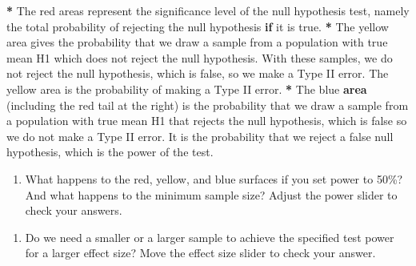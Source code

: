 \documentclass[a4paper]{book}
\newenvironment{Shaded}{\begin{snugshade}}{\end{snugshade}}
\newcommand{\KeywordTok}[1]{\textcolor[rgb]{0,0,0}{\textbf{#1}}}
\newcommand{\DecValTok}[1]{\textcolor[rgb]{0.00,0.00,0.00}{#1}}
\newcommand{\StringTok}[1]{\textcolor[rgb]{0.00,0.00,0.00}{#1}}
\newcommand{\ControlFlowTok}[1]{\textcolor[rgb]{0.00,0.00,0.00}{\textbf{#1}}}
\newcommand{\OperatorTok}[1]{\textcolor[rgb]{0.00,0.00,0.00}{\textbf{#1}}}
\newcommand{\NormalTok}[1]{#1}
\providecommand{\tightlist}{%
  \setlength{\itemsep}{0pt}\setlength{\parskip}{0pt}}
\theoremstyle{definition}
\theoremstyle{definition}
\theoremstyle{definition}
\theoremstyle{remark}
\begin{document}
\begin{Shaded}
\begin{Highlighting}[]
\OperatorTok{*}\StringTok{ }\NormalTok{The red areas represent the significance level of the null hypothesis test,}
\NormalTok{namely the total probability of rejecting the null hypothesis }\ControlFlowTok{if}\NormalTok{ it is true.}
\OperatorTok{*}\StringTok{ }\NormalTok{The yellow area gives the probability that we draw a sample from a population}
\NormalTok{with true mean H1 which does not reject the null hypothesis. With these}
\NormalTok{samples, we do not reject the null hypothesis, which is false, so we make a}
\NormalTok{Type II error. The yellow area is the probability of making a Type II error.}
\OperatorTok{*}\StringTok{ }\NormalTok{The blue }\KeywordTok{area}\NormalTok{ (including the red tail at the right) is the probability that}
\NormalTok{we draw a sample from a population with true mean H1 that rejects the null}
\NormalTok{hypothesis, which is false so we do not make a Type II error. It is the}
\NormalTok{probability that we reject a false null hypothesis, which is the power of the}
\NormalTok{test.}
\end{Highlighting}
\end{Shaded}

\begin{enumerate}
\def\labelenumi{\arabic{enumi}.}
\setcounter{enumi}{1}
\tightlist
\item
  What happens to the red, yellow, and blue surfaces if you set power to
  50\%? And what happens to the minimum sample size? Adjust the power
  slider to check your answers.
\end{enumerate}

\begin{Shaded}
\end{Shaded}

\begin{enumerate}
\def\labelenumi{\arabic{enumi}.}
\setcounter{enumi}{2}
\tightlist
\item
  Do we need a smaller or a larger sample to achieve the specified test
  power for a larger effect size? Move the effect size slider to check
  your answer.
\end{enumerate}
\end{document}
